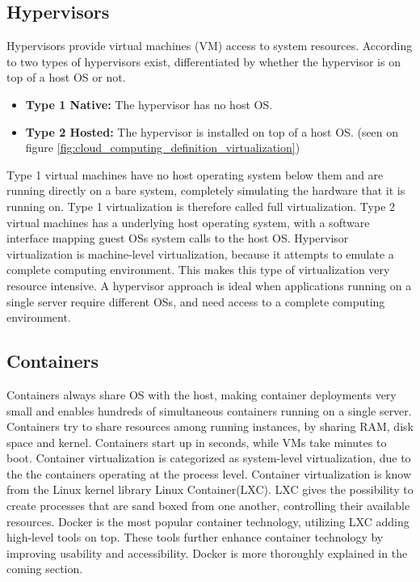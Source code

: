 \subsection{Hypervisors}
Hypervisors provide virtual machines (VM) access to system resources. According to \citeauthor{sosinsky2010cloud} two types of hypervisors exist, differentiated by whether the hypervisor is on top of a host OS or not.

\begin{itemize}
	\item \textbf{Type 1 Native:} The hypervisor has no host OS.
	\item \textbf{Type 2 Hosted:} The hypervisor is installed on top of a host OS. (seen on figure \ref{fig:cloud_computing_definition_virtualization})
\end{itemize}

Type 1 virtual machines have no host operating system below them and are running directly on a bare system, completely simulating the hardware that it is running on. Type 1 virtualization is therefore called full virtualization. Type 2 virtual machines has a underlying host operating system, with a software interface mapping guest OSs system calls to the host OS. Hypervisor virtualization is machine-level virtualization, because it attempts to emulate a complete computing environment\cite{fink2014docker}. This makes this type of virtualization very resource intensive. A hypervisor approach is ideal when applications running on a single server require different OSs, and need access to a complete computing environment.

\subsection{Containers}
Containers always share OS with the host, making container deployments very small and enables hundreds of simultaneous containers running on a single server. Containers try to share resources among running instances, by sharing RAM, disk space and kernel. Containers start up in seconds, while VMs take minutes to boot\cite{dockerFAQ}. Container virtualization is categorized as system-level virtualization, due to the the containers operating at the process level. Container virtualization is know from the Linux kernel library Linux Container(LXC). LXC gives the possibility to create processes that are sand boxed from one another, controlling their available resources. Docker is the most popular container technology, utilizing LXC adding high-level tools on top. These tools further enhance container technology by improving usability and accessibility. Docker is more thoroughly explained in the coming section. 

